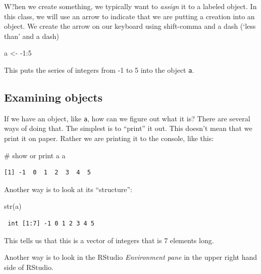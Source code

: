 \documentclass[
  letterpaper,
  DIV=11,
  numbers=noendperiod]{scrreprt}
\newenvironment{Shaded}{\begin{snugshade}}{\end{snugshade}}
\newcommand{\CommentTok}[1]{\textcolor[rgb]{0.37,0.37,0.37}{#1}}
\newcommand{\DecValTok}[1]{\textcolor[rgb]{0.68,0.00,0.00}{#1}}
\newcommand{\FunctionTok}[1]{\textcolor[rgb]{0.28,0.35,0.67}{#1}}
\newcommand{\NormalTok}[1]{\textcolor[rgb]{0.00,0.23,0.31}{#1}}
\newcommand{\OtherTok}[1]{\textcolor[rgb]{0.00,0.23,0.31}{#1}}
\newcommand{\SpecialCharTok}[1]{\textcolor[rgb]{0.37,0.37,0.37}{#1}}
\begin{document}
W?hen we create something, we typically want to \emph{assign} it to a
labeled object. In this class, we will use an arrow to indicate that we
are putting a creation into an object. We create the arrow on our
keyboard using shift-comma and a dash (`less than' and a dash)

\begin{Shaded}
\begin{Highlighting}[]
\NormalTok{a }\OtherTok{\textless{}{-}} \SpecialCharTok{{-}}\DecValTok{1}\SpecialCharTok{:}\DecValTok{5}
\end{Highlighting}
\end{Shaded}

This puts the series of integers from -1 to 5 into the object
\texttt{a}.

\subsection{Examining objects}\label{examining-objects}

If we have an object, like \texttt{a}, how can we figure out what it is?
There are several ways of doing that. The simplest is to ``print'' it
out. This doesn't mean that we print it on paper. Rather we are printing
it to the console, like this:

\begin{Shaded}
\begin{Highlighting}[]
\CommentTok{\# show or \textquotesingle{}print\textquotesingle{} a}
\NormalTok{a}
\end{Highlighting}
\end{Shaded}

\begin{verbatim}
[1] -1  0  1  2  3  4  5
\end{verbatim}

Another way is to look at its ``structure'':

\begin{Shaded}
\begin{Highlighting}[]
\FunctionTok{str}\NormalTok{(a)}
\end{Highlighting}
\end{Shaded}

\begin{verbatim}
 int [1:7] -1 0 1 2 3 4 5
\end{verbatim}

This tells us that this is a vector of integers that is 7 elements long.

Another way is to look in the RStudio \emph{Environment pane} in the
upper right hand side of RStudio.
\end{document}
